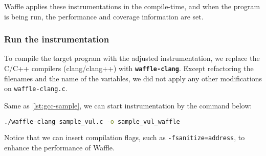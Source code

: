 Waffle applies these instrumentations in the compile-time, and when the program is being run, the performance and coverage information are set.

\subsubsection*{Run the instrumentation}

To compile the target program with the adjusted instrumentation, we replace the C/C++ compilers (clang/clang++) with \textbf{\texttt{waffle-clang}}.  \cite{clang-fast} Except refactoring the filenames and the name of the variables, we did not apply any other modifications on \texttt{waffle-clang.c}.

Same as \ref{lst:gcc-sample}, we can start instrumentation by the command below:

\begin{lstlisting}[language=bash,style=CommandStyle,label={lst:wafl-clang}]
  ./waffle-clang sample_vul.c -o sample_vul_waffle
\end{lstlisting}

Notice that we can insert compilation flags, such as \texttt{-fsanitize=address}, to enhance the performance of Waffle.
